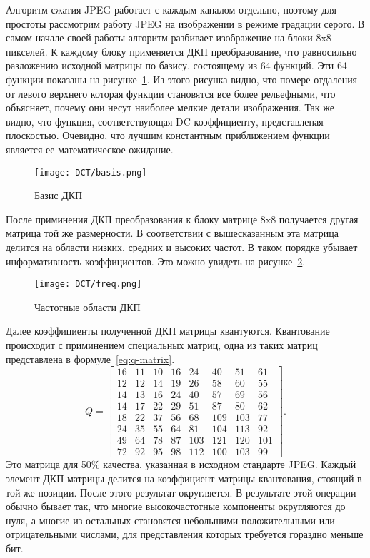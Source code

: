 Алгоритм сжатия JPEG работает с каждым каналом отдельно, поэтому для
простоты рассмотрим работу JPEG на изображении в режиме градации серого.
В самом начале своей работы алгоритм разбивает изображение на блоки
8x8 пикселей. К каждому блоку применяется ДКП преобразование,
что равносильно разложению исходной матрицы по базису, состоящему
из 64 функций. Эти 64 функции показаны на рисунке~\ref{img:basis}.
Из этого рисунка видно, что помере отдаления от левого верхнего которая
функции становятся все более рельефными, что объясняет, почему они несут
наиболее мелкие детали изображения. Так же видно, что функция,
соответствующая DC-коэффициенту, представленая плоскостью. Очевидно,
что лучшим константным приближением функции
является ее математическое ожидание.
\begin{figure}[ht]
    \centering
    \caption{Базис ДКП}
    \texttt{[image: DCT/basis.png]}
    \label{img:basis}
\end{figure}
После приминения ДКП преобразования к блоку матрице 8x8
получается другая матрица той же размерности. В соответствии с вышесказанным
эта матрица делится на области низких, средних и высоких частот. В таком порядке
убывает информативность коэффициентов. Это можно увидеть на рисунке~\ref{img:freq}.
\begin{figure}[ht]
    \centering
    \caption{Частотные области ДКП}
    \texttt{[image: DCT/freq.png]}
    \label{img:freq}
\end{figure}
Далее коэффициенты полученной ДКП матрицы квантуются.
Квантование происходит с приминением специальных матриц,
одна из таких матриц представлена в формуле~\ref{eq:q-matrix}.
\begin{equation} \label{eq:q-matrix}
Q=
\begin{bmatrix}
 16 & 11 & 10 & 16 & 24 & 40 & 51 & 61 \\
 12 & 12 & 14 & 19 & 26 & 58 & 60 & 55 \\
 14 & 13 & 16 & 24 & 40 & 57 & 69 & 56 \\
 14 & 17 & 22 & 29 & 51 & 87 & 80 & 62 \\
 18 & 22 & 37 & 56 & 68 & 109 & 103 & 77 \\
 24 & 35 & 55 & 64 & 81 & 104 & 113 & 92 \\
 49 & 64 & 78 & 87 & 103 & 121 & 120 & 101 \\
 72 & 92 & 95 & 98 & 112 & 100 & 103 & 99
\end{bmatrix}.
\end{equation}
Это матрица для 50\% качества, указанная в исходном стандарте JPEG.
Каждый элемент ДКП матрицы делится на коэффициент матрицы квантования,
стоящий в той же позиции. После этого результат округляется. В результате
этой операции обычно бывает так, что многие высокочастотные компоненты
округляются до нуля, а многие из остальных становятся небольшими положительными
или отрицательными числами, для представления которых требуется гораздно меньше бит.

